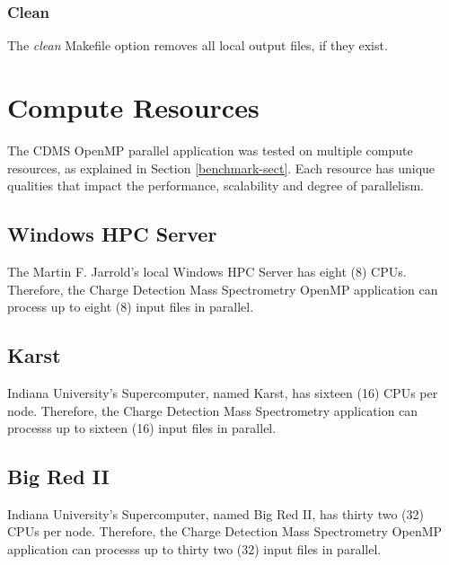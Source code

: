 \documentclass[9pt,twocolumn,twoside]{../../styles/osajnl}
\begin{document}
\subsubsection{Clean}
The \emph{clean} Makefile option removes all local output files, if
they exist.

\section{Compute Resources} \label{resources}
The CDMS OpenMP parallel application was tested on multiple compute
resources, as explained in Section \ref{benchmark-sect}. Each resource
has unique qualities that impact the performance, scalability and
degree of parallelism. 
\subsection{Windows HPC Server}
The Martin F. Jarrold's local Windows HPC Server has eight (8)
CPUs. Therefore, the Charge Detection Mass Spectrometry OpenMP
application can process up to eight (8) input files in parallel.
\subsection{Karst}
Indiana University's Supercomputer, named Karst, has sixteen (16) CPUs
per node. Therefore, the Charge Detection Mass Spectrometry
application can processs up to sixteen (16) input files in parallel.
\subsection{Big Red II}
Indiana University's Supercomputer, named Big Red II, has thirty two
(32) CPUs per node. Therefore, the Charge Detection Mass Spectrometry
OpenMP application can processs up to thirty two (32) input files in
parallel.
\end{document}
